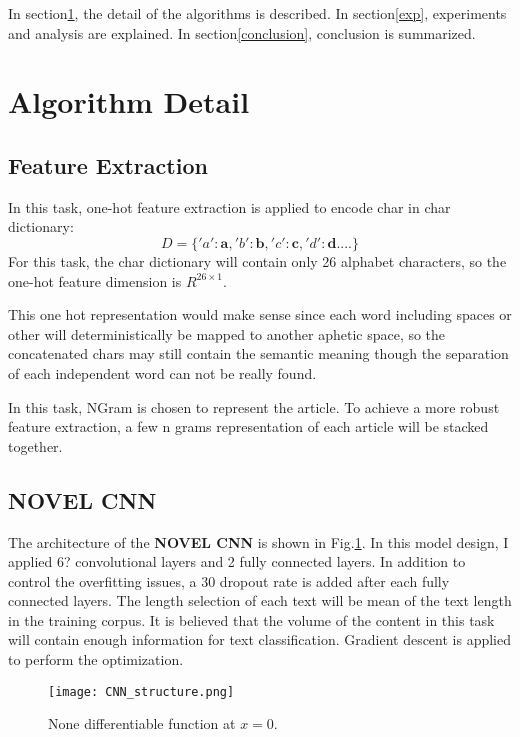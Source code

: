 \documentclass[a4paper]{article}
\begin{document}
In section\ref{algoDetail}, the detail of the algorithms is described. In section\ref{exp}, experiments and analysis are explained. In section\ref{conclusion}, conclusion is summarized.

\section{Algorithm Detail}\label{algoDetail}

\subsection{Feature Extraction}
In this task, one-hot feature extraction is applied to encode char in char dictionary:
\begin{equation}
D = \{'a': \mathbf{a},'b': \mathbf{b},'c': \mathbf{c},'d': \mathbf{d}....\}
\end{equation}
For this task, the char dictionary will contain only 26 alphabet characters, so the one-hot feature dimension is $R^{26 \times 1}$. 

This one hot representation would make sense since each word including spaces or other will deterministically be mapped to another aphetic space, so the concatenated chars may still contain the semantic meaning though the separation of each independent word can not be really found.

In this task, NGram is chosen to represent the article. To achieve a more robust feature extraction, a few n grams representation of each article will be stacked together.

\subsection{NOVEL CNN}
The architecture of the \textbf{NOVEL CNN} is shown in Fig.\ref{cnn}. In this model design, I applied 6? convolutional layers and 2 fully connected layers. In addition to control the overfitting issues, a $30$ dropout rate is added after each fully connected layers. The length selection of each text will be mean of the text length in the training corpus. It is believed that the volume of the content in this task will contain enough information for text classification. Gradient descent is applied to perform the optimization.

\begin{figure}
\begin{center}
\texttt{[image: CNN\_structure.png]}
\end{center}
\caption{None differentiable function at $x=0$.}\label{cnn}
\end{figure}
\end{document}
